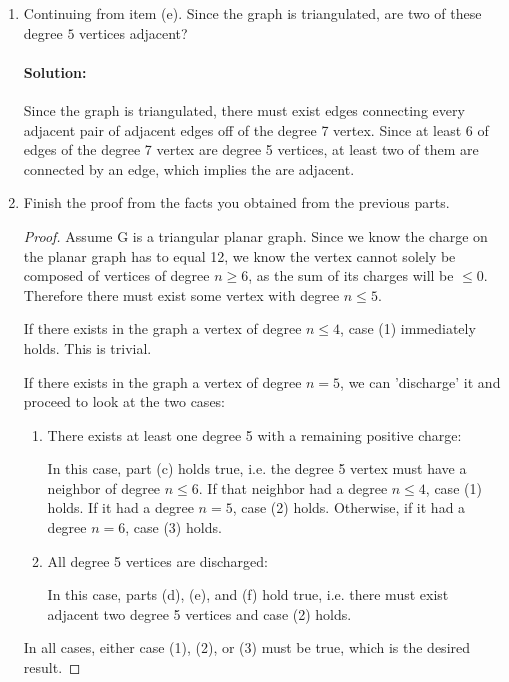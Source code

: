 \documentclass[11pt, notitlepage]{report}
\newenvironment{solution}{\paragraph{Solution:}}{\hfill}
\begin{document}
\begin{enumerate}[label=(\alph*)]
\item Continuing from item (e). Since the graph is triangulated, 
  are two of these degree $5$ vertices adjacent?
\begin{solution}
	Since the graph is triangulated, there must exist edges connecting every adjacent pair of adjacent edges off of the degree 7 vertex. Since at least 6 of edges of the degree 7 vertex are degree 5 vertices, at least two of them are connected by an edge, which implies the are adjacent.
\end{solution}

\item Finish the proof from the facts you obtained from the previous
  parts.
  
  
  \begin{proof}
  	  Assume G is a triangular planar graph. Since we know the charge on the planar graph has to equal 12, we know the vertex cannot solely be composed of vertices of degree $n\geq 6$, as the sum of its charges will be $\leq 0$. Therefore there must exist some vertex with degree $n\leq 5$.
  
  If there exists in the graph a vertex of degree $n\leq 4$, case (1) immediately holds. This is trivial.
  
  If there exists in the graph a vertex of degree $n=5$, we can 'discharge' it and proceed to look at the two cases:
  \begin{enumerate}[label=\roman*.)]
  	\item There exists at least one degree 5 with a remaining positive charge: 

In this case, part (c) holds true, i.e. the degree 5 vertex must have a neighbor of degree $n \leq 6$. If that neighbor had a degree $n \leq 4$, case (1) holds. If it had a degree $n = 5$, case (2) holds. Otherwise, if it had a degree $n = 6$, case (3) holds.
  	\item All degree 5 vertices are discharged: 

  	In this case, parts (d), (e), and (f) hold true, i.e. there must exist adjacent two degree 5 vertices and case (2) holds. 
  \end{enumerate}
  In all cases, either case (1), (2), or (3) must be true, which is the desired result.
  \end{proof}
  



\end{enumerate}
\end{document}
